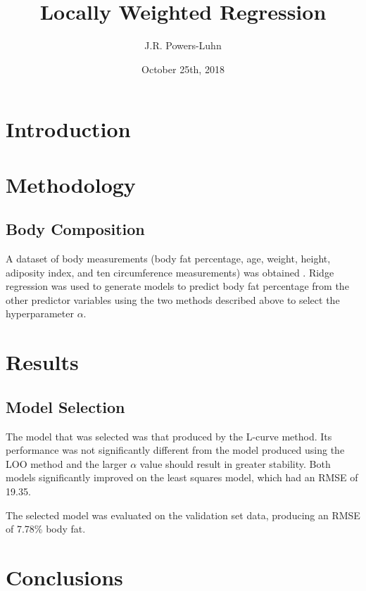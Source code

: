 \documentclass{IEEEtran}
\author{J.R. Powers-Luhn}
\title{Locally Weighted Regression}
\date{October 25th, 2018}
\begin{document}
\maketitle

\begin{abstract}



\end{abstract}

\section{Introduction}



\section{Methodology}



\subsection{Body Composition}
A dataset of body measurements (body fat percentage, age, weight, height, adiposity index, and ten 
circumference measurements) was obtained \cite{Penrose1985}. Ridge regression was used to generate models to 
predict body fat percentage from the other predictor variables using the two methods described above to select 
the hyperparameter $\alpha$.

\section{Results}



\subsection{Model Selection}
The model that was selected was that produced by the L-curve method. Its performance was not significantly 
different from the model produced using the LOO method and the larger $\alpha$ value should result in greater 
stability. Both models significantly improved on the least squares model, which had an RMSE of \num{19.35}.

The selected model was evaluated on the validation set data, producing an RMSE of \num{7.78}\% body fat.
\section{Conclusions}
\end{document}
